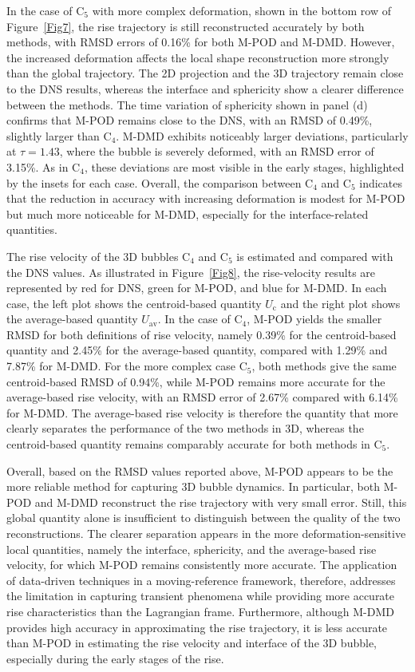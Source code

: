 \documentclass[a4paper,fleqn]{cas-sc}
\begin{document}
	In the case of C$_5$ with more complex deformation, shown in the bottom row of Figure~\ref{Fig7}, the rise trajectory is still reconstructed accurately by both methods, with RMSD errors of 0.16\% for both M-POD and M-DMD. However, the increased deformation affects the local shape reconstruction more strongly than the global trajectory. The 2D projection and the 3D trajectory remain close to the DNS results, whereas the interface and sphericity show a clearer difference between the methods. The time variation of sphericity shown in panel (d) confirms that M-POD remains close to the DNS, with an RMSD of 0.49\%, slightly larger than C$_4$. M-DMD exhibits noticeably larger deviations, particularly at $\tau=1.43$, where the bubble is severely deformed, with an RMSD error of 3.15\%. As in C$_4$, these deviations are most visible in the early stages, highlighted by the insets for each case. Overall, the comparison between C$_4$ and C$_5$ indicates that the reduction in accuracy with increasing deformation is modest for M-POD but much more noticeable for M-DMD, especially for the interface-related quantities.
	
	The rise velocity of the 3D bubbles C$_4$ and C$_5$ is estimated and compared with the DNS values. As illustrated in Figure~\ref{Fig8}, the rise-velocity results are represented by red for DNS, green for M-POD, and blue for M-DMD. In each case, the left plot shows the centroid-based quantity $U_{\mathrm{c}}$ and the right plot shows the average-based quantity $U_{\mathrm{av}}$. In the case of C$_4$, M-POD yields the smaller RMSD for both definitions of rise velocity, namely 0.39\% for the centroid-based quantity and 2.45\% for the average-based quantity, compared with 1.29\% and 7.87\% for M-DMD. For the more complex case C$_5$, both methods give the same centroid-based RMSD of 0.94\%, while M-POD remains more accurate for the average-based rise velocity, with an RMSD error of 2.67\% compared with 6.14\% for M-DMD. The average-based rise velocity is therefore the quantity that more clearly separates the performance of the two methods in 3D, whereas the centroid-based quantity remains comparably accurate for both methods in C$_5$.
	
	Overall, based on the RMSD values reported above, M-POD appears to be the more reliable method for capturing 3D bubble dynamics. In particular, both M-POD and M-DMD reconstruct the rise trajectory with very small error. Still, this global quantity alone is insufficient to distinguish between the quality of the two reconstructions. The clearer separation appears in the more deformation-sensitive local quantities, namely the interface, sphericity, and the average-based rise velocity, for which M-POD remains consistently more accurate. The application of data-driven techniques in a moving-reference framework, therefore, addresses the limitation in capturing transient phenomena while providing more accurate rise characteristics than the Lagrangian frame. Furthermore, although M-DMD provides high accuracy in approximating the rise trajectory, it is less accurate than M-POD in estimating the rise velocity and interface of the 3D bubble, especially during the early stages of the rise.
		
\end{document}
